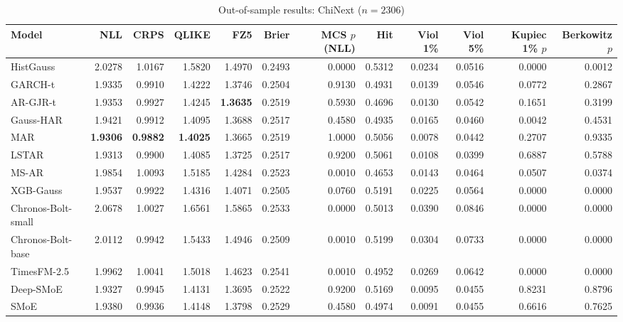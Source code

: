 \begin{table}[!htbp]\centering\scriptsize
\caption{Out-of-sample results: ChiNext ($n=2306$)}\label{tab:asset_chinext}
\begin{adjustbox}{max width=\textwidth}
\begin{tabular}{lrrrrrrrrrrr}
\toprule
Model & NLL & CRPS & QLIKE & FZ5 & Brier & MCS $p$ (NLL) & Hit & Viol 1\% & Viol 5\% & Kupiec 1\% $p$ & Berkowitz $p$\\
\midrule
HistGauss & 2.0278 & 1.0167 & 1.5820 & 1.4970 & 0.2493 & 0.0000 & 0.5312 & 0.0234 & 0.0516 & 0.0000 & 0.0012\\
GARCH-t & 1.9335 & 0.9910 & 1.4222 & 1.3746 & 0.2504 & 0.9130 & 0.4931 & 0.0139 & 0.0546 & 0.0772 & 0.2867\\
AR-GJR-t & 1.9353 & 0.9927 & 1.4245 & \textbf{1.3635} & 0.2519 & 0.5930 & 0.4696 & 0.0130 & 0.0542 & 0.1651 & 0.3199\\
Gauss-HAR & 1.9421 & 0.9912 & 1.4095 & 1.3688 & 0.2517 & 0.4580 & 0.4935 & 0.0165 & 0.0460 & 0.0042 & 0.4531\\
MAR & \textbf{1.9306} & \textbf{0.9882} & \textbf{1.4025} & 1.3665 & 0.2519 & 1.0000 & 0.5056 & 0.0078 & 0.0442 & 0.2707 & 0.9335\\
LSTAR & 1.9313 & 0.9900 & 1.4085 & 1.3725 & 0.2517 & 0.9200 & 0.5061 & 0.0108 & 0.0399 & 0.6887 & 0.5788\\
MS-AR & 1.9854 & 1.0093 & 1.5185 & 1.4284 & 0.2523 & 0.0010 & 0.4653 & 0.0143 & 0.0464 & 0.0507 & 0.0374\\
XGB-Gauss & 1.9537 & 0.9922 & 1.4316 & 1.4071 & 0.2505 & 0.0760 & 0.5191 & 0.0225 & 0.0564 & 0.0000 & 0.0000\\
Chronos-Bolt-small & 2.0678 & 1.0027 & 1.6561 & 1.5865 & 0.2533 & 0.0000 & 0.5013 & 0.0390 & 0.0846 & 0.0000 & 0.0000\\
Chronos-Bolt-base & 2.0112 & 0.9942 & 1.5433 & 1.4946 & 0.2509 & 0.0010 & 0.5199 & 0.0304 & 0.0733 & 0.0000 & 0.0000\\
TimesFM-2.5 & 1.9962 & 1.0041 & 1.5018 & 1.4623 & 0.2541 & 0.0010 & 0.4952 & 0.0269 & 0.0642 & 0.0000 & 0.0000\\
Deep-SMoE & 1.9327 & 0.9945 & 1.4131 & 1.3695 & 0.2522 & 0.9200 & 0.5169 & 0.0095 & 0.0455 & 0.8231 & 0.8796\\
SMoE & 1.9380 & 0.9936 & 1.4148 & 1.3798 & 0.2529 & 0.4580 & 0.4974 & 0.0091 & 0.0455 & 0.6616 & 0.7625\\
\bottomrule
\end{tabular}
\end{adjustbox}
\end{table}